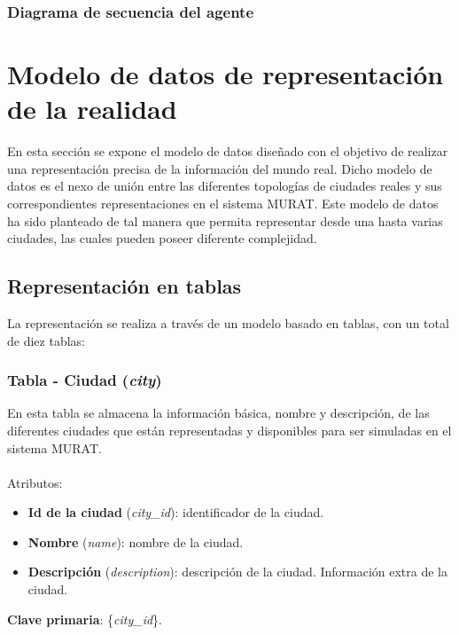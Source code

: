 \subsubsection{Diagrama de secuencia del agente}

\renewcommand{\labelitemi}{$\bullet$}
\renewcommand{\labelitemii}{$\circ$}
\renewcommand{\labelitemiii}{$\Rightarrow$}

\newpage
\section{Modelo de datos de representación de la realidad}
En esta sección se expone el modelo de datos diseñado con el objetivo de realizar una representación precisa de la información del mundo real. Dicho modelo de datos es el nexo de unión entre las diferentes topologías de ciudades reales y sus correspondientes representaciones en el sistema MURAT. Este modelo de datos ha sido planteado de tal manera que permita representar desde una hasta varias ciudades, las cuales pueden poseer diferente complejidad.

\subsection{Representación en tablas}
La representación se realiza a través de un modelo basado en tablas, con un total de diez tablas:

\subsubsection{Tabla - Ciudad (\textit{city})}
En esta tabla se almacena la información básica, nombre y descripción, de las diferentes ciudades que están representadas y disponibles para ser simuladas en el sistema MURAT. \\\\
Atributos:
\begin{itemize}
    \item \textbf{Id de la ciudad} (\textit{city\_id}): identificador de la ciudad.
    \item \textbf{Nombre} (\textit{name}): nombre de la ciudad.
    \item \textbf{Descripción} (\textit{description}): descripción de la ciudad. Información extra de la ciudad.
\end{itemize}
\textbf{Clave primaria}: \{\textit{city\_id}\}. \\

